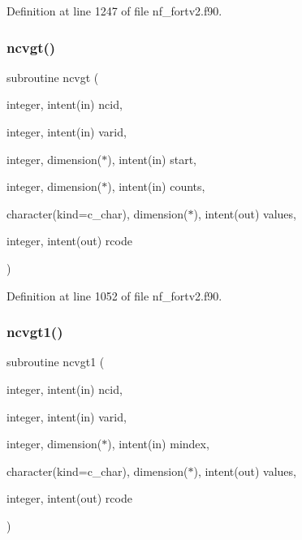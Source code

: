 Definition at line 1247 of file nf\+\_\+fortv2.\+f90.

\mbox{\label{nf__fortv2_8f90_a376e4bb1238c7da316b25b32d34608f7}} 
\subsubsection{\texorpdfstring{ncvgt()}{ncvgt()}}
{\footnotesize\ttfamily subroutine ncvgt (\begin{DoxyParamCaption}\item[{integer, intent(in)}]{ncid,  }\item[{integer, intent(in)}]{varid,  }\item[{integer, dimension($\ast$), intent(in)}]{start,  }\item[{integer, dimension($\ast$), intent(in)}]{counts,  }\item[{character(kind=c\+\_\+char), dimension($\ast$), intent(out)}]{values,  }\item[{integer, intent(out)}]{rcode }\end{DoxyParamCaption})}



Definition at line 1052 of file nf\+\_\+fortv2.\+f90.

\mbox{\label{nf__fortv2_8f90_a6c63eb6533f6fd980258f9ded00cf4e1}} 
\subsubsection{\texorpdfstring{ncvgt1()}{ncvgt1()}}
{\footnotesize\ttfamily subroutine ncvgt1 (\begin{DoxyParamCaption}\item[{integer, intent(in)}]{ncid,  }\item[{integer, intent(in)}]{varid,  }\item[{integer, dimension($\ast$), intent(in)}]{mindex,  }\item[{character(kind=c\+\_\+char), dimension($\ast$), intent(out)}]{values,  }\item[{integer, intent(out)}]{rcode }\end{DoxyParamCaption})}



